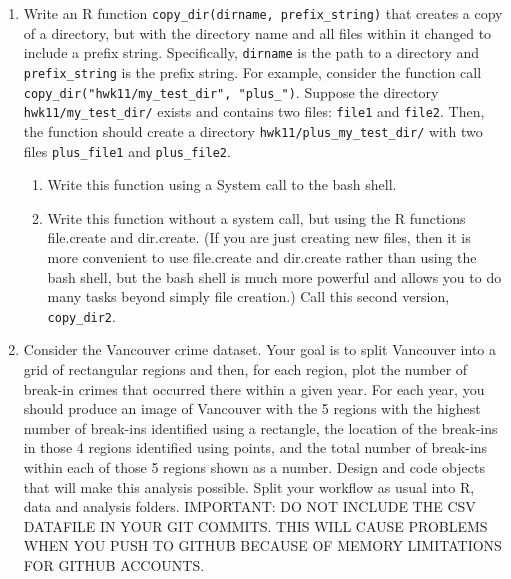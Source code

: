 \documentclass{article}
\begin{document}
\begin{enumerate}
\item Write an R function \verb+copy_dir(dirname, prefix_string)+ that creates a copy of a directory, but with the directory name and all files within it changed to include a prefix string.  Specifically, \verb+dirname+ is the path to a directory and \verb+prefix_string+ is the prefix string.  For example, consider the function call \verb+copy_dir("hwk11/my_test_dir", "plus_")+.   Suppose the directory \verb+hwk11/my_test_dir/+ exists and contains two files: \verb+file1+ and \verb+file2+.  Then, the function should create a directory \verb+hwk11/plus_my_test_dir/+ with two files \verb+plus_file1+ and \verb+plus_file2+. 
\begin{enumerate}
\item Write this function using a System call to the bash shell.
\item Write this function without a system call, but using the R functions file.create and dir.create.  (If you are just creating new files, then it is more convenient to use file.create and dir.create rather than using the bash shell, but the bash shell is much more powerful and allows you to do many tasks beyond simply file creation.)  Call this second version, \verb+copy_dir2+.  
\end{enumerate}

\item Consider the Vancouver crime dataset.  Your goal is to split Vancouver into a grid of rectangular regions and then, for each region, plot the number of break-in crimes that occurred there within a given year.  For each year, you should produce an image of Vancouver with the 5 regions with the highest number of break-ins identified using a rectangle, the location of the break-ins in those 4 regions identified using points, and the total number of break-ins within each of those 5 regions shown as a number.   Design and code objects that will make this analysis possible.  Split your workflow as usual into R, data and analysis folders.  IMPORTANT:  DO NOT INCLUDE THE CSV DATAFILE IN YOUR GIT COMMITS.  THIS WILL CAUSE PROBLEMS WHEN YOU PUSH TO GITHUB BECAUSE OF MEMORY LIMITATIONS FOR GITHUB ACCOUNTS.
\end{enumerate}
\end{document}

